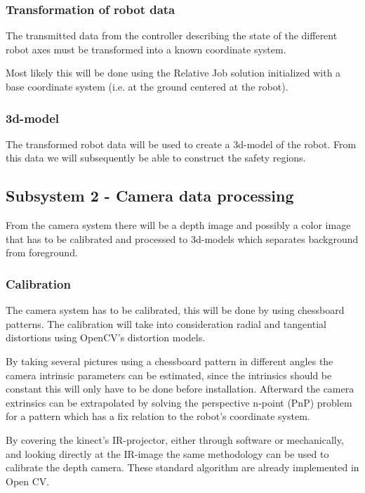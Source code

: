 \documentclass[10pt,a4paper,twocolumn,english]{article}
\begin{document}
\subsubsection{Transformation of robot data}

The transmitted data from the controller describing the state of the different robot axes must be transformed into a known coordinate system.

Most likely this will be done using the Relative Job solution initialized with a base coordinate system (i.e. at the ground centered at the robot).

\subsubsection{3d-model}

The transformed robot data will be used to create a 3d-model of the robot. From this data we will subsequently be able to construct the safety regions.

\subsection{Subsystem 2 - Camera data processing}

From the camera system there will be a depth image and possibly a color image that has to be calibrated and processed to 3d-models which separates background from foreground.

\subsubsection{Calibration}

The camera system has to be calibrated, this will be done by using chessboard patterns. The calibration will take into consideration radial and tangential distortions using OpenCV's distortion models.

By taking several pictures using a chessboard pattern in different angles the camera intrinsic parameters can be estimated, since the intrinsics should be constant this will only have to be done before installation. Afterward the camera extrinsics can be extrapolated by solving the perspective n-point (PnP) problem for a pattern which has a fix relation to the robot's coordinate system.

By covering the kinect's IR-projector, either through software or mechanically, and looking directly at the IR-image the same methodology can be used to calibrate the depth camera.
These standard algorithm are already implemented in Open CV.\cite{opencv-calibration}
\end{document}
